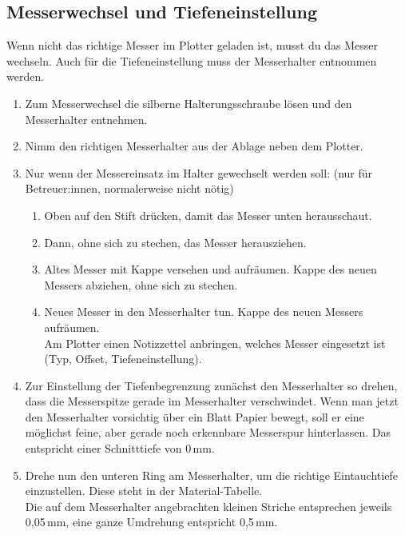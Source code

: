 \documentclass{\basedir/fablab-document}
\begin{document}
\subsection{Messerwechsel und Tiefeneinstellung}

Wenn nicht das richtige Messer im Plotter geladen ist, musst du das Messer wechseln.
Auch für die Tiefeneinstellung muss der Messerhalter entnommen werden.

\label{messerwechsel}


\begin{enumerate}
 \item Zum Messerwechsel die silberne Halterungsschraube lösen und den Messerhalter entnehmen.
 \item Nimm den richtigen Messerhalter aus der Ablage neben dem Plotter.
 \item Nur wenn der Messereinsatz im Halter gewechselt werden soll: (nur für Betreuer:innen, normalerweise nicht nötig)
    \begin{enumerate}
    \item Oben auf den Stift drücken, damit das Messer unten herausschaut. 
    \item Dann, ohne sich zu stechen, das Messer herausziehen. 
    \item Altes Messer mit Kappe versehen und aufräumen. Kappe des neuen Messers abziehen, ohne sich zu stechen.
    \item Neues Messer in den Messerhalter tun. Kappe des neuen Messers aufräumen.\\ Am Plotter einen Notizzettel anbringen, welches Messer eingesetzt ist (Typ, Offset, Tiefeneinstellung).
    \end{enumerate}
\item Zur Einstellung der Tiefenbegrenzung zunächst den Messerhalter so drehen, dass die Messerspitze gerade im Messerhalter verschwindet. Wenn man jetzt den Messerhalter vorsichtig über ein Blatt Papier bewegt, soll er eine möglichst feine, aber gerade noch erkennbare Messerspur hinterlassen. Das entspricht einer Schnitttiefe von 0\,mm. 
\item Drehe nun den unteren Ring am Messerhalter, um die richtige Eintauchtiefe einzustellen. Diese steht in der Material-Tabelle. \\Die auf dem Messerhalter angebrachten kleinen Striche entsprechen jeweils 0,05\,mm, eine ganze Umdrehung entspricht 0,5\,mm.

\end{enumerate}
\end{document}
